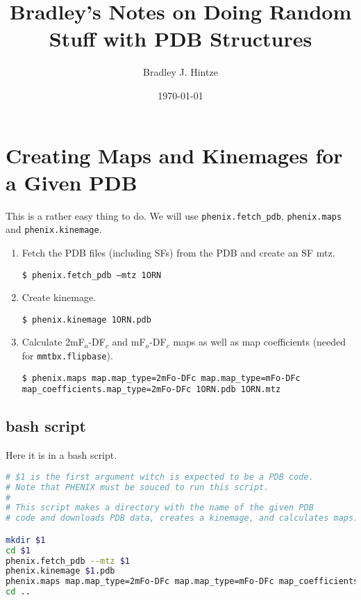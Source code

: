 \documentclass[12pt]{article}
\newcommand{\cmdline}[1]{\vspace{5mm} \noindent
\texttt{\$ #1}
\vspace{5mm}

}
\begin{document}
\title{Bradley's Notes on Doing Random Stuff with PDB Structures}
\author{Bradley J. Hintze}
\date{\today}

\maketitle

\tableofcontents

\newpage

\section{Creating Maps and Kinemages for a Given PDB}
This is a rather easy thing to do. We will use \texttt{phenix.fetch\_pdb}, \texttt{phenix.maps} and \texttt{phenix.kinemage}.
\begin{enumerate}
  \item Fetch the PDB files (including SFs) from the PDB and create an SF mtz.
  
  \vspace{-6mm}
  \cmdline{phenix.fetch\_pdb --mtz 1ORN}
  \vspace{-6mm}
  \item Create kinemage.

  \vspace{-6mm}
  \cmdline{phenix.kinemage 1ORN.pdb}
  \vspace{-6mm}
  \item Calculate 2mF$_{o}$-DF$_{c}$ and mF$_{o}$-DF$_{c}$ maps as well as map coefficients (needed for \texttt{mmtbx.flipbase}).
  
  \vspace{-6mm}
  \cmdline{phenix.maps map.map\_type=2mFo-DFc map.map\_type=mFo-DFc\\
  map\_coefficients.map\_type=2mFo-DFc 1ORN.pdb 1ORN.mtz}
\end{enumerate}

\subsection{bash script}
Here it is in a bash script.
\begin{lstlisting}[language=bash]
# $1 is the first argument witch is expected to be a PDB code.
# Note that PHENIX must be souced to run this script.
#
# This script makes a directory with the name of the given PDB
# code and downloads PDB data, creates a kinemage, and calculates maps.

mkdir $1
cd $1
phenix.fetch_pdb --mtz $1
phenix.kinemage $1.pdb
phenix.maps map.map_type=2mFo-DFc map.map_type=mFo-DFc map_coefficients.map_type=2mFo-DFc $1.pdb $1.mtz
cd ..
\end{lstlisting}
\end{document}
